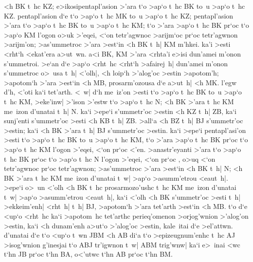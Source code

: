 \begin{Parallel}{}{}
{{<h BK t~hc  KZ;
e>ikosipentapl'asion >'ara t`o >ap`o t~hc BK to~u >ap`o t~hc KZ.
pentapl'asion d`e t`o >ap`o t~hc MK to~u >ap`o t~hc KZ; pentapl'asion
>'ara t`o >ap`o t~hc BK to~u >ap`o t~hc KM; t`o >'ara >ap`o t~hc
BK pr`oc t`o >ap`o KM l'ogon o>uk >'eqei, <`on tetr'agwnoc >arijm`oc
pr`oc tetr'agwnon >arijm'on; >as'ummetroc >'ara >est`in <h BK t~h| KM
m'hkei. ka'i >esti <rht`h <ekat'era a>ut~wn. a<i BK, KM >'ara
<rhta'i e>isi dun'amei m'onon s'ummetroi. >e`an d`e >ap`o <rht~hc
<rht`h >afairej~h| dun'amei m'onon s'ummetroc o>~usa t~h|
<'olh|, <h loip`h >'alog'oc >estin >apotom'h; >apotom`h >'ara
>est`in <h MB, prosarm'ozousa d`e a>ut~h| <h MK. l'egw d'h,
<'oti ka`i tet'arth. <~w| d`h me~iz'on >esti t`o >ap`o t~hc BK
to~u >ap`o t~hc KM, >eke'inw| >'ison >'estw t`o >ap`o t~hc
N; <h BK >'ara t~hc KM
me~izon d'unatai t~h| N. ka`i >epe`i
s'ummetr'oc >estin <h KZ t~h| ZB, ka`i sunj'enti s'ummetr'oc >esti <h KB t~h| ZB. >all`a <h BZ t~h| BJ s'ummetr'oc >estin; ka`i <h BK >'ara t~h|
BJ s'ummetr'oc >estin. ka`i >epe`i pentapl'asi'on >esti t`o >ap`o t~hc
BK to~u >ap`o t~hc KM, t`o >'ara >ap`o t~hc BK pr`oc t`o >ap`o
t~hc KM l'ogon >'eqei, <`on  pr`oc <'en. >anastr'eyanti >'ara
t`o >ap`o t~hc BK pr`oc t`o >ap`o t~hc N l'ogon >'eqei, <`on 
pr`oc , o>uq <`on tetr'agwnoc pr`oc tetr'agwnon; >as'ummetroc
>'ara >est`in <h BK t~h| N; <h BK >'ara t~hc KM me~izon
d'unatai t~w| >ap`o >asumm'etrou <eaut~h|. >epe`i o>~un <'olh
<h BK t~hc prosarmozo'ushc t~hc KM me~izon d'unatai t~w| >ap`o
>asumm'etrou <eaut~h|, ka`i <'olh <h BK s'ummetr'oc >esti t~h| >ekkeim'enh|
<rht~h| t~h| BJ, >apotom`h >'ara tet'arth >est`in <h MB. t`o d`e <up`o <rht~hc
ka`i >apotom~hc tet'arthc perieq'omenon >orjog'wnion >'alog'on >estin,
ka`i <h dunam'enh a>ut`o >'alog'oc >estin, kale~itai d`e >el'attwn. d'unatai
d`e t`o <up`o t~wn JBM <h AB di`a t`o >epizeugnum'enhc
t~hc AJ >isog'wnion g'inesjai t`o ABJ tr'igwnon t~w| ABM trig'wnw|
ka`i e>~inai <wc t`hn JB pr`oc t`hn BA, o<'utwc t`hn AB pr`oc
t`hn BM.}

}

\end{Parallel}
